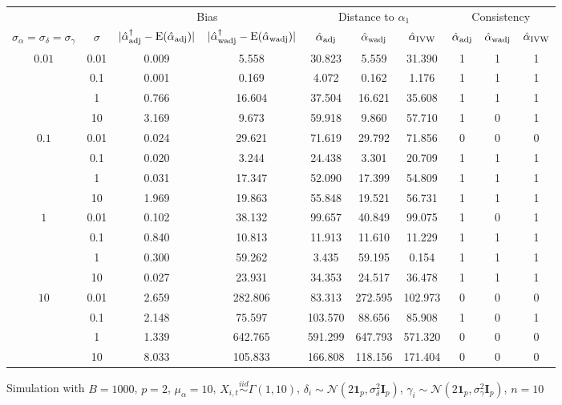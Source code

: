 \documentclass[11pt]{article}
\newcommand{\simiid}{\stackrel{iid}{\sim}} %
\def\normal#1#2{\mathcal{N}(#1,#2)} %
\def\E#1{\mathrm{E}(#1)} %
\theoremstyle{definition}
\begin{document}
\begin{sidewaysfigure}
 \caption{Simulation  with $B = 1000$, $p = 2$, $\mu_{\alpha}=10$, $X_{i,t} \simiid \Gamma(1,10)$, $\delta_i \sim \normal{2\mathbf{1}_p}{\sigma^2_{\delta}\mathbf{I}_p}$, $\gamma_i \sim \normal{2\mathbf{1}_p}{\sigma^2_{\gamma}\mathbf{I}_p}$, $n = 10$} \vspace{.2cm}
\centering
\begin{tabular}{cc|cc|ccc|ccc}
&  & \multicolumn{2}{c|}{Bias} & \multicolumn{3}{c|}{Distance to $\alpha_1$} & \multicolumn{3}{c}{Consistency} \\ 
$\sigma_{\alpha} = \sigma_{\delta}=\sigma_{\gamma}$ & $\sigma$ & $|\hat{\alpha}_{\rm adj}^{\dagger}-\E{\hat{\alpha}_{\rm adj}}|$ & $|\hat{\alpha}_{\rm wadj}^{\dagger}-\E{\hat{\alpha}_{\rm wadj}}|$ & $\hat{\alpha}_{\rm adj}$ & $\hat{\alpha}_{\rm wadj}$ & $\hat{\alpha}_{\rm IVW}$ & $\hat{\alpha}_{\rm adj}$ & $\hat{\alpha}_{\rm wadj}$ & $\hat{\alpha}_{\rm IVW}$ \\[.3cm] 
\multirow{4}{*}{$0.01$} & 0.01 & 0.009 & 5.558 & 30.823 & 5.559 & 31.390 & 1  & 1  & 1  \\ 
   & 0.1 & 0.001 & 0.169 & 4.072 & 0.162 & 1.176 & 1  & 1  & 1  \\ 
   & 1 & 0.766 & 16.604 & 37.504 & 16.621 & 35.608 & 1  & 1  & 1  \\ 
   & 10 & 3.169 & 9.673 & 59.918 & 9.860 & 57.710 & 1  & 0  & 1  \\[.3cm] 
 \multirow{4}{*}{$0.1$} &  0.01 & 0.024 & 29.621 & 71.619 & 29.792 & 71.856 & 0  & 0  & 0  \\ 
  & 0.1 & 0.020 & 3.244 & 24.438 & 3.301 & 20.709 & 1  & 1  & 1  \\ 
   & 1 & 0.031 & 17.347 & 52.090 & 17.399 & 54.809 & 1  & 1  & 1  \\ 
  & 10 & 1.969 & 19.863 & 55.848 & 19.521 & 56.731 & 1  & 1  & 1  \\[.3cm] 
\multirow{4}{*}{$1$} &   0.01 & 0.102 & 38.132 & 99.657 & 40.849 & 99.075 & 1  & 0  & 1  \\ 
   & 0.1 & 0.840 & 10.813 & 11.913 & 11.610 & 11.229 & 1  & 1  & 1  \\ 
   & 1 & 0.300 & 59.262 & 3.435 & 59.195 & 0.154 & 1  & 1  & 1  \\ 
   & 10 & 0.027 & 23.931 & 34.353 & 24.517 & 36.478 & 1  & 1  & 1  \\[.3cm] 
 \multirow{4}{*}{$10$} &  0.01 & 2.659 & 282.806 & 83.313 & 272.595 & 102.973 & 0  & 0  & 0  \\ 
  & 0.1 & 2.148 & 75.597 & 103.570 & 88.656 & 85.908 & 1  & 0  & 1  \\ 
   & 1 & 1.339 & 642.765 & 591.299 & 647.793 & 571.320 & 0  & 0  & 0  \\ 
   & 10 & 8.033 & 105.833 & 166.808 & 118.156 & 171.404 & 0  & 0  & 0  \\
\end{tabular}
\end{sidewaysfigure}
\end{document}

